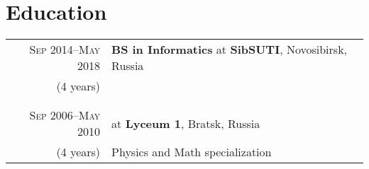 \documentclass[a4paper,11pt]{article}
\begin{document}
  \section{Education}
    \begin{longtable}{r|p{}}
      \textsc{Sep 2014--May 2018} & \large \sffamily \textbf{BS in Informatics} at \textbf{SibSUTI},
                                    Novosibirsk, Russia \\
      (4 years) & \\
      \\&\\
      \textsc{Sep 2006--May 2010} & \large \sffamily at \textbf{Lyceum 1}, Bratsk, Russia \\
      (4 years) & Physics and Math specialization \\
    \end{longtable}
\end{document}
